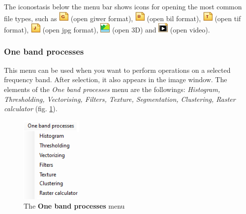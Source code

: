 \documentclass[a4paper,12pt]{article}
\begin{document}
The iconostasis below the menu bar shows icons for opening the most common file types, such as \includegraphics [width = 0.5cm] {opengiwer.png} (open giwer format), \includegraphics [width = 0.5cm] {openbil.png} (open bil format), \includegraphics [width = 0.5cm] {opentif.png} (open tif format), \includegraphics [width = 0.5cm] {openjpg.png} (open jpg format), \includegraphics [width = 0.5cm ] {3d.png} (open 3D) and \includegraphics [width = 0.5cm] {openvideo.png} (open video). 


\subsubsection{One band processes}

This menu can be used when you want to perform operations on a selected frequency band. After selection, it also appears in the image window.
The elements of the \textit {One band processes} menu are the followings: \textit {Histogram, Thresholding, Vectorising, Filters, Texture, Segmentation, Clustering, Raster calculator} (fig. \ref {fig:onebandmenu}). 

\begin{figure}
	\centering
	\includegraphics[width=3cm]{onebandmenu.png}
	\caption{The \textbf{One band processes} menu}
	\label{fig:onebandmenu}
\end{figure}
\end{document}
